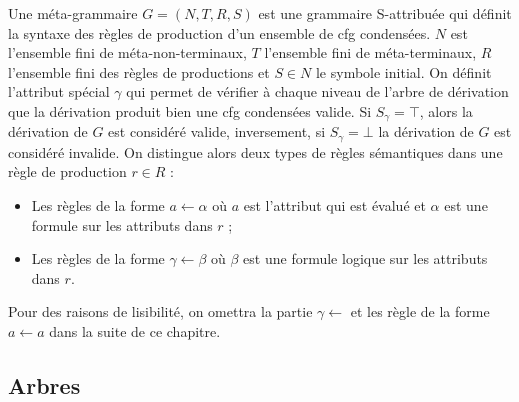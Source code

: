 \begin{definition}
    Une méta-grammaire $G = (N, T, R, S)$ est une grammaire S-attribuée qui définit la syntaxe des règles de production d'un ensemble de \gls{cfg} condensées.
    $N$ est l'ensemble fini de méta-non-terminaux, $T$ l'ensemble fini de méta-terminaux, $R$ l'ensemble fini des règles de productions et $S \in N$ le symbole initial.
    On définit l'attribut spécial $\gamma$ qui permet de vérifier à chaque niveau de l'arbre de dérivation que la dérivation produit bien une \gls{cfg} condensées valide.
    Si $S_\gamma = \top$, alors la dérivation de $G$ est considéré valide, inversement, si $S_\gamma = \bot$ la dérivation de $G$ est considéré invalide.
    On distingue alors deux types de règles sémantiques dans une règle de production $r \in R$ :
    \begin{itemize}
        \item Les règles de la forme $a \gets \alpha$ où $a$ est l'attribut qui est évalué et $\alpha$ est une formule sur les attributs dans $r$ ;
        \item Les règles de la forme $\gamma \gets \beta$ où $\beta$ est une formule logique sur les attributs dans $r$.
    \end{itemize}
    Pour des raisons de lisibilité, on omettra la partie $\gamma \gets$ et les règle de la forme $a \gets a$ dans la suite de ce chapitre.
\end{definition}

\subsection{Arbres}


